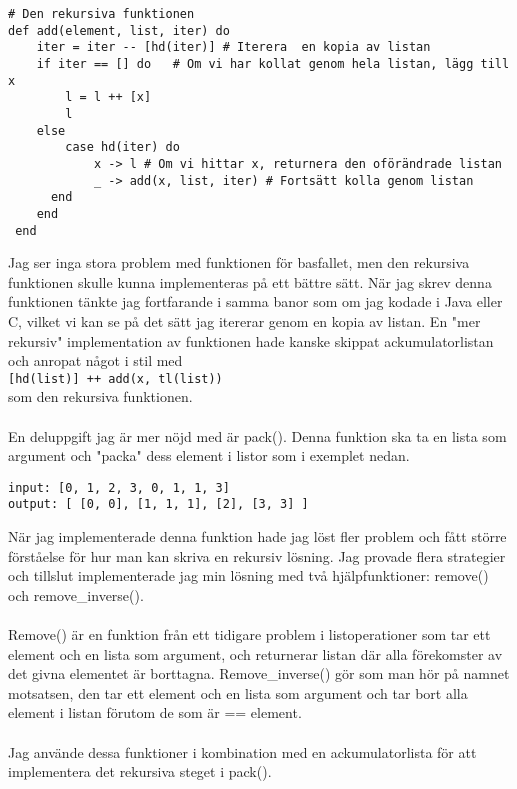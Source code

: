 \documentclass[a4paper,11pt]{article}
\begin{document}
\begin{verbatim}
# Den rekursiva funktionen
def add(element, list, iter) do
    iter = iter -- [hd(iter)] # Iterera  en kopia av listan
    if iter == [] do   # Om vi har kollat genom hela listan, lägg till x
        l = l ++ [x]
        l
    else
        case hd(iter) do
	        x -> l # Om vi hittar x, returnera den oförändrade listan
	        _ -> add(x, list, iter) # Fortsätt kolla genom listan
      end
    end
 end
\end{verbatim}
Jag ser inga stora problem med funktionen för basfallet, men den rekursiva funktionen skulle kunna implementeras på ett bättre sätt. När jag skrev denna funktionen tänkte jag fortfarande i samma banor som om jag kodade i Java eller C, vilket vi kan se på det sätt  jag itererar genom en kopia av listan. En "mer rekursiv" implementation av funktionen hade kanske skippat ackumulatorlistan och anropat något i stil med\\
{\tt [hd(list)] ++ add(x, tl(list))} \\
som den rekursiva funktionen.\\\\
En deluppgift jag är mer nöjd med är pack(). Denna funktion ska ta en lista som argument och "packa" dess element i listor som i exemplet nedan.
\begin{verbatim}
input: [0, 1, 2, 3, 0, 1, 1, 3]
output: [ [0, 0], [1, 1, 1], [2], [3, 3] ]
\end{verbatim}
När jag implementerade denna funktion hade jag löst fler problem och fått större förståelse för hur man kan skriva en rekursiv lösning. Jag provade flera strategier och tillslut implementerade jag min lösning med två hjälpfunktioner: remove() och remove\_inverse().\\\\
Remove() är en funktion från ett tidigare problem i listoperationer som tar ett element och en lista som argument, och returnerar listan där alla förekomster av det givna elementet är borttagna. Remove\_inverse() gör som man hör på namnet motsatsen, den tar ett element och en lista som argument och tar bort alla element i listan förutom de som är == element.\\\\
Jag använde dessa funktioner i kombination med en ackumulatorlista för att implementera det rekursiva steget i pack().
\end{document}
